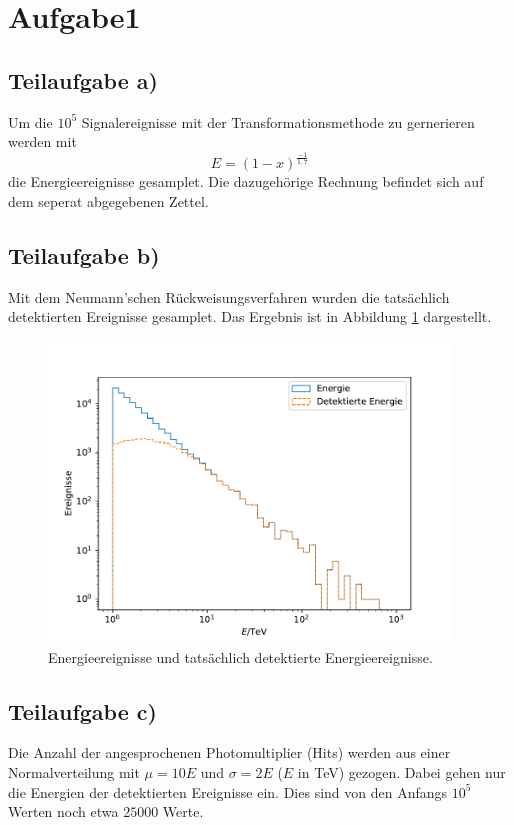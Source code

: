 \section{Aufgabe1}
\label{sec:Aufgabe1}
%
\subsection{Teilaufgabe a)}
Um die $10^5$ Signalereignisse mit der Transformationsmethode zu gernerieren werden
mit
\begin{equation*}
  E=(1-x)^{\frac{-1}{1,7}}
\end{equation*}
die Energieereignisse gesamplet. Die dazugehörige Rechnung befindet sich auf dem
seperat abgegebenen Zettel.
\subsection{Teilaufgabe b)}
Mit dem Neumann'schen Rückweisungsverfahren wurden die tatsächlich detektierten
Ereignisse gesamplet. Das Ergebnis ist in Abbildung \ref{fig:Energie} dargestellt.
\begin{figure}[h]
  \centering
  \includegraphics[height = 8cm]{plots/Energie.pdf}
  \caption{Energieereignisse und tatsächlich detektierte Energieereignisse.}
  \label{fig:Energie}
\end{figure}
\subsection{Teilaufgabe c)}
Die Anzahl der angesprochenen Photomultiplier (Hits) werden aus einer Normalverteilung
mit $\mu=10 E$ und $\sigma=2 E$ ($E$ in TeV) gezogen. Dabei gehen nur
die Energien der detektierten Ereignisse ein. Dies sind von den Anfangs $10^5$ Werten noch
etwa $25000$ Werte.

